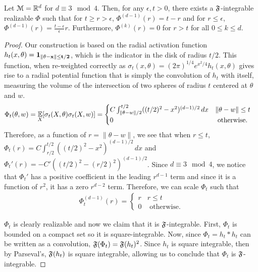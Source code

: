 \begin{lemma}\label{baseConstruct}
Let $\mathcal{M} = {\mathbb{R}}^d$ for $d \equiv 3 \mod 4$. Then, for any $\epsilon, t > 0$, there exists a ${\mathfrak{F}}$-integrable realizable $\Phi$ such that for $t \geq r > \epsilon$, $\Phi^{(d-1)}(r) = t -r$ and for $ r \leq \epsilon$, $\Phi^{(d-1)}(r) = \frac{t-\epsilon}{\epsilon}r$. Furthermore, $\Phi^{(k)}(r) = 0$ for $r > t$ for all $0 \leq k \leq d$.
\end{lemma}

\begin{proof}
Our construction is based on the radial activation function $h_t(x, \theta) = \bf{1}_{\|\theta - x\| \leq t/2}$, which is the indicator in the disk of radius $t/2$. This function, when re-weighted correctly as $\sigma_t(x,\theta) =  (2\pi)^{1/4} e^{x^2/4}h_t(x,\theta)$ gives rise to a radial potential function that is simply the convolution of $h_t$ with itself, measuring the volume of the intersection of two spheres of radius $t$ centered at $\theta$ and $w$.
%
\begin{align*}
\Phi_t(\theta, w) & = \operatorname*{\mathbb{E}}_X[\sigma_t(X,\theta)\sigma_t(X,w)]
= \begin{cases}
C\int_{\|\theta - w\|/2}^{t/2} ((t/2)^2 - x^2)^{(d-1)/2} \, dx & \|\theta - w\| \leq t\\
0 & \textrm{ otherwise.}
\end{cases}
\end{align*}
%
Therefore, as a function of $r=\|\theta - w \|$, we see that when $r \leq t$, $\Phi_t(r) = C\int_{r/2}^{t/2} ((t/2)^2-x^2)^{(d-1)/2} \, dx$ and $\Phi_t'(r) = -C'((t/2)^2-(r/2)^2)^{(d-1)/2}$. Since $d \equiv 3 \mod 4$, we notice that $\Phi_t'$ has a positive coefficient in the leading $r^{d-1}$ term and since it is a function of $r^2$, it has a zero $r^{d-2}$ term. Therefore, we can scale $\Phi_t$ such that 
\begin{align*}
\Phi_t^{(d-1)}(r) = \begin{cases}
r & r \leq t\\
0 & \textrm{ otherwise.}
\end{cases} 
\end{align*}

$\Phi_t$ is clearly realizable and now we claim that it is ${\mathfrak{F}}$-integrable. First, $\Phi_t$ is bounded on a compact set so it is square-integrable. Now, since $\Phi_t = h_t \ast h_t$ can be written as a convolution, ${\mathfrak{F}}(\Phi_t) = {\mathfrak{F}}(h_t)^2$. Since $h_t$ is square integrable, then by Parseval's, ${\mathfrak{F}}(h_t)$ is square integrable, allowing us to conclude that $\Phi_t$ is ${\mathfrak{F}}$-integrable.


\end{proof}
